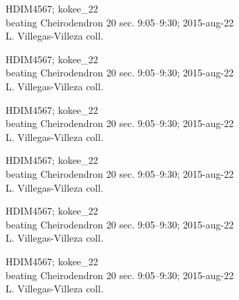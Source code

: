 \documentclass[2pt]{extarticle}
\begin{document}
\noindent
\parbox{0.16\textwidth}{\tiny \raggedright \rule[-0.3\baselineskip]{0pt}{10pt}HDIM4567; kokee\_22\\ beating Cheirodendron 20 sec. 9:05--9:30; 2015-aug-22\\ L. Villegas-Villeza coll.}
\parbox{0.16\textwidth}{\tiny \raggedright \rule[-0.3\baselineskip]{0pt}{10pt}HDIM4567; kokee\_22\\ beating Cheirodendron 20 sec. 9:05--9:30; 2015-aug-22\\ L. Villegas-Villeza coll.}
\parbox{0.16\textwidth}{\tiny \raggedright \rule[-0.3\baselineskip]{0pt}{10pt}HDIM4567; kokee\_22\\ beating Cheirodendron 20 sec. 9:05--9:30; 2015-aug-22\\ L. Villegas-Villeza coll.}
\parbox{0.16\textwidth}{\tiny \raggedright \rule[-0.3\baselineskip]{0pt}{10pt}HDIM4567; kokee\_22\\ beating Cheirodendron 20 sec. 9:05--9:30; 2015-aug-22\\ L. Villegas-Villeza coll.}
\parbox{0.16\textwidth}{\tiny \raggedright \rule[-0.3\baselineskip]{0pt}{10pt}HDIM4567; kokee\_22\\ beating Cheirodendron 20 sec. 9:05--9:30; 2015-aug-22\\ L. Villegas-Villeza coll.}
\parbox{0.16\textwidth}{\tiny \raggedright \rule[-0.3\baselineskip]{0pt}{10pt}HDIM4567; kokee\_22\\ beating Cheirodendron 20 sec. 9:05--9:30; 2015-aug-22\\ L. Villegas-Villeza coll.} \\ 
\vspace{0.001in} 
\end{document}
